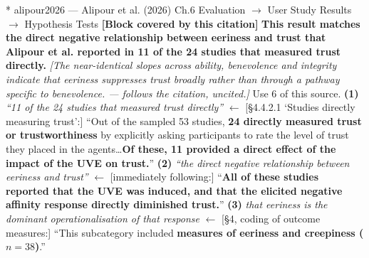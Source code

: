 \documentclass[11pt, a4paper]{article}
\makeatletter
\newcounter{citentry}
\newcommand{\citentry@core}[7]{%
  \stepcounter{citentry}
  \begingroup
  \sbox{\citentry@measurebox}{%
    \begin{minipage}{\linewidth}
      \noindent\colorbox{konstanzblue}{\parbox{\dimexpr\linewidth-2\fboxsep}{%
        \vspace{3pt}
        \textbf{\#\thecitentry \quad #2} \hfill \textit{#3}
        \vspace{3pt}
      }}
      \vspace{3pt}
      \noindent\begin{tabular}{@{}p{2.7cm} p{\dimexpr\linewidth-3cm}@{}}
        \textit{\small Sentence in thesis:} & #4 \\[5pt]
        \textbf{Usage:}\hfill       & #5 \\[5pt]
        \textit{\small Original source:}     & #6 \\[5pt]
        \textbf{How to check:}             & #7 \\
      \end{tabular}
      \vspace{5pt}
      \rule{10pt}{10pt}\quad \textbf{Validated} --- I have read the original and agree it supports the sentence.
    \end{minipage}%
  }%
  \Needspace{\dimexpr\ht\citentry@measurebox+\dp\citentry@measurebox\relax}%
  \endgroup
  \vspace{10pt}
  \noindent\colorbox{konstanzblue}{\parbox{\dimexpr\linewidth-2\fboxsep}{%
    \vspace{3pt}
    \textcolor{white}{\textbf{\#\thecitentry \quad #2}} \hfill \textcolor{white}{\textit{#3}}
    \vspace{3pt}
  }}
  \vspace{3pt}
  \noindent\begin{tabular}{@{}p{2.7cm} p{\dimexpr\linewidth-3cm}@{}}
    \textit{\small Sentence in thesis:} & \textcolor{darkgreen}{#4} \\[5pt]
    \textbf{Usage:}\hfill       & #5 \\[5pt]
    \textit{\small Original source:}     & \textcolor{darkred}{#6} \\[5pt]
    \textbf{How to check:}             & #7 \\
  \end{tabular}
  \vspace{5pt}
  \noindent\CheckBox[name=verified\thecitentry, width=10pt, height=10pt, bordercolor={0 0 0}, borderwidth=0.75, backgroundcolor={1 1 1}#1]{}\quad \textbf{Validated} --- I have read the original and agree it supports the sentence.
  \vspace{3pt}
  \noindent\textcolor{midgray}{\rule{\linewidth}{0.4pt}}
}
\newcommand{\citentry}{\@ifstar{\citentry@core{, checked}}{\citentry@core{}}}
\makeatother
\begin{document}
\begin{Form}
\citentry*
  {alipour2026 --- Alipour et al. (2026)}
  {Ch.6 Evaluation $\rightarrow$ User Study Results $\rightarrow$ Hypothesis Tests}
  {\textbf{[Block covered by this citation]} \textbf{This result matches the direct negative relationship between eeriness and trust that Alipour et al. reported in 11 of the 24 studies that measured trust directly.} \emph{[The near-identical slopes across ability, benevolence and integrity indicate that eeriness suppresses trust broadly rather than through a pathway specific to benevolence. --- follows the citation, uncited.]}}
  {Use 6 of this source.}
  {\textbf{(1)} \emph{``11 of the 24 studies that measured trust directly''} $\leftarrow$ [\S4.4.2.1 `Studies directly measuring trust':] ``Out of the sampled 53 studies, \textbf{24 directly measured trust or trustworthiness} by explicitly asking participants to rate the level of trust they placed in the agents\ldots \textbf{Of these, 11 provided a direct effect of the impact of the UVE on trust.}'' \quad \textbf{(2)} \emph{``the direct negative relationship between eeriness and trust''} $\leftarrow$ [immediately following:] ``\textbf{All of these studies reported that the UVE was induced, and that the elicited negative affinity response directly diminished trust.}'' \quad \textbf{(3)} \emph{that eeriness is the dominant operationalisation of that response} $\leftarrow$ [\S4, coding of outcome measures:] ``This subcategory included \textbf{measures of eeriness and creepiness ($n = 38$)}.''}

\end{Form}
\end{document}
